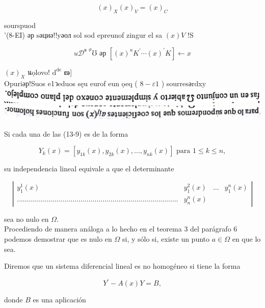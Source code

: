 \documentclass[10pt]{article}
\theoremstyle{plain}
\theoremstyle{definition}
\theoremstyle{remark}
\begin{document}
$$
(x)_{X}(x)_{V}=(x)_{C}
$$

sourspuod\\
'(8-EI) әр sәциә!!yәол sol sod epreunof zingur el sa $(x) V$ !S

$$
u \mathcal{D}^{\text {แ } \vartheta} \mho \text { әр }\left[(x)^{u} K^{\prime} \cdots(x)^{\prime} K\right] \leftarrow x
$$

$(x)_{X}$ นọlovo! $\mathrm{d}^{\mathrm{d} \mathrm{e}}$ ణ]\\
Opuriәр!Suos e1วeduos sęu eurof eun ọeq ( $8-\varepsilon 1$ ) sourresәrdxy\\
\includegraphics[max width=\textwidth, center]{2025_09_05_adecef5eb2053bc129b5g-331(6)}\\
\includegraphics[max width=\textwidth, center]{2025_09_05_adecef5eb2053bc129b5g-331(9)}

Si cada una de las (13-9) es de la forma

$$
Y_{k}(x)=\left[y_{1 k}(x), y_{2 k}(x), \ldots, y_{n k}(x)\right] \text { para } 1 \leqslant k \leqslant n,
$$

su independencia lineal equivale a que el determinante

\[
\left|\begin{array}{cccc}
y_{1}^{1}(x) & y_{1}^{2}(x) & \ldots & y_{1}^{n}(x)  \tag{13-10}\\
\ldots \ldots \ldots \ldots \ldots \ldots \ldots \ldots \ldots \ldots \ldots \ldots \ldots \ldots \ldots \ldots \ldots \ldots \ldots \ldots \ldots \ldots \ldots \ldots \ldots \ldots \ldots & y_{n}^{n}(x)
\end{array}\right|
\]

sea no nulo en $\Omega$.\\
Procediendo de manera análoga a lo hecho en el teorema 3 del parágrafo 6 podemos demostrar que es nulo en $\Omega$ si, y sólo si, existe un punto $a \in \Omega$ en que lo sea.

Diremos que un sistema diferencial lineal es no homogéneo si tiene la forma


\begin{equation*}
Y^{\prime}-A(x) Y=B, \tag{13-11}
\end{equation*}


donde $B$ es una aplicación
\end{document}
